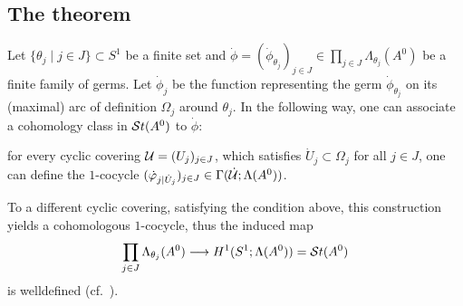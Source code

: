 \subsection{The theorem}
Let $\{\theta_j\mid j\in J\}\subset S^1$ be a finite set and
$\dot\phi=(\dot\phi_{\theta_j})_{j\in J}
\in\prod_{j\in J}\Lambda_{\theta_j}(A^0)$ be a finite family of germs.
Let $\dot\phi_j$ be the function representing the germ $\dot\phi_{\theta_j}$
on its (maximal) arc of definition $\Omega_j$ around $\theta_j$.
In the following way, one can associate a cohomology class in $\mathcal{S}{}t(A^0)$ to
$\dot\phi$:
\begin{einr}
  for every cyclic covering $\mathcal{U}=(U_j)_{j\in J}$, which satisfies
  $\dot U_j\subset\Omega_j$ for all $j\in J$, one can define the $1$-cocycle
  $(\dot{\varphi}_{j|\dot U_j})_{j\in J}\in\Gamma(\dot{\mathcal{U}};\Lambda(A^0))$.
\end{einr}
To a different cyclic covering, satisfying the condition above, this
construction yields a cohomologous $1$-cocycle, thus the induced map
\begin{equation}\label{eq:mapStoToCocy}
  \prod_{j\in J}\Lambda_{\theta_j}(A^0)
  \longrightarrow
  H^1(S^1;\Lambda(A^0))=\mathcal{S}{}t(A^0)
\end{equation}
is welldefined (cf.\ \cite[868]{Loday1994}).


